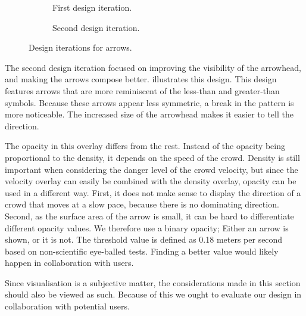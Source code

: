 \begin{figure}[htbp]
\begin{subfigure}[c]{.49\linewidth}
    \centering
    \caption{First design iteration.}
    \label{fig:first_arrow_design}
\end{subfigure}
%
\begin{subfigure}[c]{.49\linewidth}
    \centering
    \caption{Second design iteration.}
    \label{fig:second_arrow_design}
\end{subfigure}
\caption{Design iterations for arrows.}
\end{figure}



The second design iteration focused on improving the visibility of the arrowhead, and making the arrows compose better.  illustrates this design. This design features arrows that are more reminiscent of the less-than and greater-than symbols. Because these arrows appear less symmetric, a break in the pattern is more noticeable. The  increased size of the arrowhead makes it easier to tell the direction.

The opacity in this overlay differs from the rest. Instead of the opacity being proportional to the density, it depends on the speed of the crowd. Density is still important when considering the danger level of the crowd velocity, but since the velocity overlay can easily be combined with the density overlay, opacity can be used in a different way. First, it does not make sense to display the direction of a crowd that moves at a slow pace, because there is no dominating direction. Second, as the surface area of the arrow is small, it can be hard to differentiate different opacity values. We therefore use a binary opacity; Either an arrow is shown, or it is not. The threshold value is defined as 0.18 meters per second based on non-scientific eye-balled tests. Finding a better value would likely happen in collaboration with users.

Since visualisation is a subjective matter, the considerations made in this section should also be viewed as such. Because of this we ought to evaluate our design in collaboration with potential users.